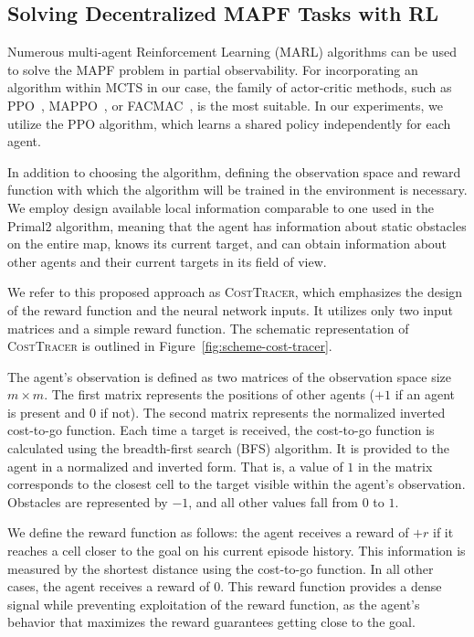 \documentclass[letterpaper]{article} %
\begin{document}
\subsection{Solving Decentralized MAPF Tasks with RL}



Numerous multi-agent Reinforcement Learning (MARL) algorithms can be used to solve the MAPF problem in partial observability. For incorporating an algorithm within MCTS in our case, the family of actor-critic methods, such as PPO~\cite{schulman2017proximal}, MAPPO~\cite{yu2022surprising}, or FACMAC~\cite{peng2021facmac}, is the most suitable. In our experiments, we utilize the PPO algorithm, which learns a shared policy independently for each agent.

In addition to choosing the algorithm, defining the observation space and reward function with which the algorithm will be trained in the environment is necessary. We employ design available local information comparable to one used in the Primal2 algorithm, meaning that the agent has information about static obstacles on the entire map, knows its current target, and can obtain information about other agents and their current targets in its field of view. 

We refer to this proposed approach as \textsc{CostTracer}, which emphasizes the design of the reward function and the neural network inputs. It utilizes only two input matrices and a simple reward function. The schematic representation of \textsc{CostTracer} is outlined in Figure~\ref{fig:scheme-cost-tracer}.  


The agent's observation is defined as two matrices of the observation space size $m\times m$. 
The first matrix represents the positions of other agents ($+1$ if an agent is present and $0$ if not). The second matrix represents the normalized inverted cost-to-go function. Each time a target is received, the cost-to-go function is calculated using the breadth-first search (BFS) algorithm. It is provided to the agent in a normalized and inverted form. That is, a value of $1$ in the matrix corresponds to the closest cell to the target visible within the agent's observation. Obstacles are represented by $-1$, and all other values fall from $0$ to $1$.

We define the reward function as follows: the agent receives a reward of $+r$ if it reaches a cell closer to the goal on his current episode history. This information is  measured by the shortest distance using the cost-to-go function. In all other cases, the agent receives a reward of $0$. This reward function provides a dense signal while preventing exploitation of the reward function, as the agent's behavior that maximizes the reward guarantees getting close to the goal. 
\end{document}
